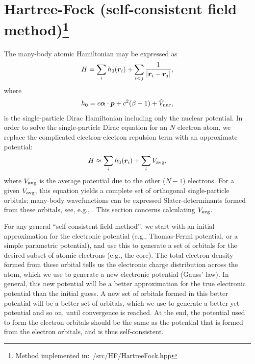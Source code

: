 \documentclass[10pt,twocolumn,a4paper]{article}%
\renewcommand{\v}[1]{\ensuremath{\boldsymbol{#1}}}		%
\newcommand{\be}{\begin{equation}}
\newcommand{\ee}{\end{equation}}
\def\en{\ensuremath{\varepsilon}}
\begin{document}


\section[Hartree-Fock (self-consistent field method)]{Hartree-Fock (self-consistent field method)\footnote{Method implemented in:~/src/HF/HartreeFock.hpp}}


The many-body atomic Hamiltonian may be expressed as
\be\label{eq:H-manybody}
H = \sum_i h_{\rm 0}(\v{r}_i) + \sum_{i<j}\frac{1}{|\v{r}_i-\v{r}_j|},
\ee
where 
\[h_0 = c \v{\alpha}\cdot\v{p} + c^2(\beta-1) + \hat V_{\rm nuc},\]
is the single-particle Dirac Hamiltonian including only the nuclear potential.
In order to solve the single-particle Dirac equation for an $N$ electron atom, we replace the complicated electron-electron repulsion term with an approximate potential:
\be
H \approx \sum_i h_{\rm 0}(\v{r}_i) + \sum_{i}V_{\rm avg},
\ee
where $V_{\rm avg}$ is the average potential due to the other ($N-1$) electrons.
For a given $V_{\rm avg}$, this equation yields a complete set of orthogonal single-particle orbitals; many-body wavefunctions can be expressed Slater-determinants formed from these orbitals, see, e.g., \cite{JohnsonBook2007,Lindgren1986}.
This section concerns calculating $V_{\rm avg}$.


For any general ``self-consistent field method'', we start with an initial approximation for the electronic potential (e.g., Thomas-Fermi potential, or a simple parametric potential), and use this to generate a set of orbitals for the desired subset of atomic electrons (e.g., the core).
The total electron density formed from these orbital tells us the electronic charge distribution across the atom, which we use to generate a new electronic potential (Gauss' law).
In general, this new potential will be a better approximation for the true electronic potential than the initial guess.
A new set of orbitals formed in this better potential will be a better set of orbitals, which we use to generate a better-yet potential and so on, until convergence is reached.
At the end, the potential used to form the electron orbitals should be the same as the potential that is formed from the electron orbitals, and is thus self-consistent.
\end{document}
